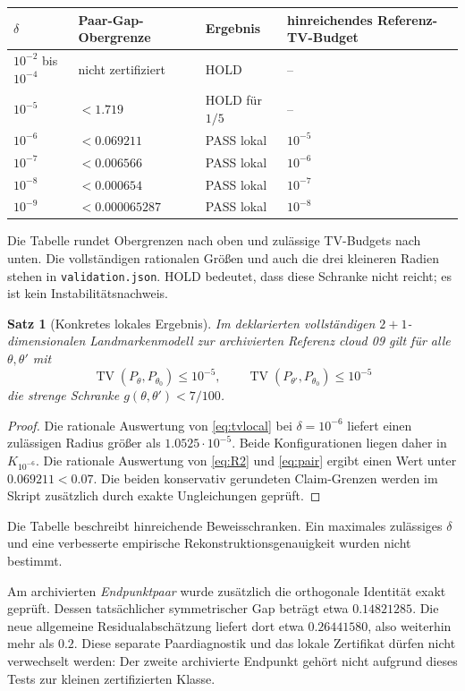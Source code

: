 \documentclass[11pt,a4paper]{article}
\newtheorem{theorem}{Satz}\newtheorem{lemma}{Lemma}\newtheorem{corollary}{Korollar}
\newcommand{\TV}{\operatorname{TV}}\newcommand{\Pois}{\operatorname{Pois}}
\begin{document}
\begin{center}\begin{tabular}{@{}llll@{}}\toprule
$\delta$ & Paar-Gap-Obergrenze & Ergebnis & hinreichendes Referenz-TV-Budget\\\midrule
$10^{-2}$ bis $10^{-4}$ & nicht zertifiziert & HOLD & --\\
$10^{-5}$ & $<1.719$ & HOLD für $1/5$ & --\\
$10^{-6}$ & $<0.069211$ & PASS lokal & $10^{-5}$\\
$10^{-7}$ & $<0.006566$ & PASS lokal & $10^{-6}$\\
$10^{-8}$ & $<0.000654$ & PASS lokal & $10^{-7}$\\
$10^{-9}$ & $<0.000065287$ & PASS lokal & $10^{-8}$\\
\bottomrule\end{tabular}\end{center}
Die Tabelle rundet Obergrenzen nach oben und zulässige TV-Budgets nach unten. Die vollständigen rationalen Größen und auch die drei kleineren Radien stehen in \texttt{validation.json}. HOLD bedeutet, dass diese Schranke nicht reicht; es ist kein Instabilitätsnachweis.

\begin{theorem}[Konkretes lokales Ergebnis]
Im deklarierten vollständigen $2+1$-dimensionalen Landmarkenmodell zur archivierten Referenz cloud 09 gilt für alle $\theta,\theta'$ mit
\[
 \TV(P_\theta,P_{\theta_0})\leq10^{-5},\qquad
 \TV(P_{\theta'},P_{\theta_0})\leq10^{-5}
\]
die strenge Schranke $g(\theta,\theta')<7/100$.
\end{theorem}
\begin{proof}
Die rationale Auswertung von \eqref{eq:tvlocal} bei $\delta=10^{-6}$ liefert einen zulässigen Radius größer als $1.0525\cdot10^{-5}$. Beide Konfigurationen liegen daher in $K_{10^{-6}}$. Die rationale Auswertung von \eqref{eq:R2} und \eqref{eq:pair} ergibt einen Wert unter $0.069211<0.07$. Die beiden konservativ gerundeten Claim-Grenzen werden im Skript zusätzlich durch exakte Ungleichungen geprüft.
\end{proof}

Die Tabelle beschreibt hinreichende Beweisschranken. Ein maximales zulässiges $\delta$ und eine verbesserte empirische Rekonstruktionsgenauigkeit wurden nicht bestimmt.

Am archivierten \emph{Endpunktpaar} wurde zusätzlich die orthogonale Identität exakt geprüft. Dessen tatsächlicher symmetrischer Gap beträgt etwa $0.14821285$. Die neue allgemeine Residualabschätzung liefert dort etwa $0.26441580$, also weiterhin mehr als $0.2$. Diese separate Paardiagnostik und das lokale Zertifikat dürfen nicht verwechselt werden: Der zweite archivierte Endpunkt gehört nicht aufgrund dieses Tests zur kleinen zertifizierten Klasse.
\end{document}

